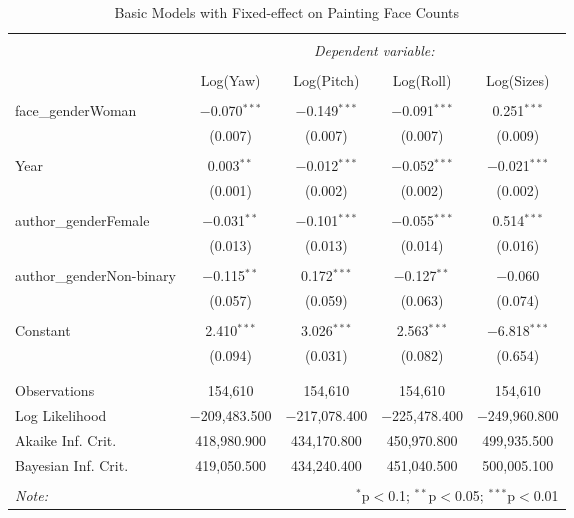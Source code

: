
\begin{table}[!htbp] \centering 
  \caption{Basic Models with Fixed-effect on Painting Face Counts} 
  \label{} 
\begin{tabular}{@{\extracolsep{5pt}}lcccc} 
\\[-1.8ex]\hline 
\hline \\[-1.8ex] 
 & \multicolumn{4}{c}{\textit{Dependent variable:}} \\ 
\cline{2-5} 
\\[-1.8ex] & Log(Yaw) & Log(Pitch) & Log(Roll) & Log(Sizes) \\ 
\hline \\[-1.8ex] 
 face\_genderWoman & $-$0.070$^{***}$ & $-$0.149$^{***}$ & $-$0.091$^{***}$ & 0.251$^{***}$ \\ 
  & (0.007) & (0.007) & (0.007) & (0.009) \\ 
  & & & & \\ 
 Year & 0.003$^{**}$ & $-$0.012$^{***}$ & $-$0.052$^{***}$ & $-$0.021$^{***}$ \\ 
  & (0.001) & (0.002) & (0.002) & (0.002) \\ 
  & & & & \\ 
 author\_genderFemale & $-$0.031$^{**}$ & $-$0.101$^{***}$ & $-$0.055$^{***}$ & 0.514$^{***}$ \\ 
  & (0.013) & (0.013) & (0.014) & (0.016) \\ 
  & & & & \\ 
 author\_genderNon-binary & $-$0.115$^{**}$ & 0.172$^{***}$ & $-$0.127$^{**}$ & $-$0.060 \\ 
  & (0.057) & (0.059) & (0.063) & (0.074) \\ 
  & & & & \\ 
 Constant & 2.410$^{***}$ & 3.026$^{***}$ & 2.563$^{***}$ & $-$6.818$^{***}$ \\ 
  & (0.094) & (0.031) & (0.082) & (0.654) \\ 
  & & & & \\ 
\hline \\[-1.8ex] 
Observations & 154,610 & 154,610 & 154,610 & 154,610 \\ 
Log Likelihood & $-$209,483.500 & $-$217,078.400 & $-$225,478.400 & $-$249,960.800 \\ 
Akaike Inf. Crit. & 418,980.900 & 434,170.800 & 450,970.800 & 499,935.500 \\ 
Bayesian Inf. Crit. & 419,050.500 & 434,240.400 & 451,040.500 & 500,005.100 \\ 
\hline 
\hline \\[-1.8ex] 
\textit{Note:}  & \multicolumn{4}{r}{$^{*}$p$<$0.1; $^{**}$p$<$0.05; $^{***}$p$<$0.01} \\ 
\end{tabular} 
\end{table} 

